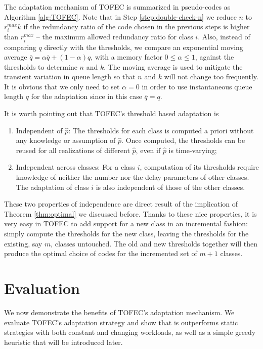 \documentclass[journal]{IEEEtran}
\newcommand{\ourproposal}{TOFEC\xspace}
\newcommand{\compVec}{\hat{p}}
\begin{document}
The adaptation mechanism of \ourproposal is summarized in pseudo-codes as Algorithm \ref{alg:TOFEC}.
Note that in Step \ref{step:double-check-n} we reduce $n$ to $r_i^{max}k$ if the redundancy ratio of the code chosen in the previous steps is higher than $r_i^{max}$ -- the maximum allowed redundancy ratio for class $i$. 
Also, instead of comparing $q$ directly with the thresholds, we compare an exponential moving average 
$\overline{q} = \alpha \overline{q} + (1-\alpha)q$,
with a memory factor $0\le \alpha \le 1$, against the thresholds to determine $n$ and $k$. The moving average is used to mitigate the transient variation in queue length so that $n$ and $k$ will not change too frequently. It is obvious that we only need to set $\alpha=0$ in order to use instantaneous queue length $q$ for the adaptation since in this case $\overline{q}=q$.

It is worth pointing out that \ourproposal's threshold based adaptation is 
\begin{enumerate}
	\item Independent of $\compVec$: The thresholds for each class is computed a priori without any knowledge or assumption of $\compVec$. Once computed, the thresholds can be reused for all realizations of different $\compVec$, even if $\compVec$ is time-varying;
	\item Independent across classes: For a class $i$, computation of its thresholds  require knowledge of neither the number nor the delay parameters of other classes. The adaptation of class $i$ is also independent of those of the other classes.
\end{enumerate}
These two properties of independence are direct result of the implication of Theorem \ref{thm:optimal} we discussed before.
Thanks to these nice properties, it is very easy in \ourproposal to add support for a new class in an incremental fashion: simply compute the thresholds for the new class, leaving the thresholds for the existing, say $m$, classes untouched. The old and new thresholds together will then produce the optimal choice of codes for the incremented set of $m+1$ classes.






\section{Evaluation}
\label{sec:evaluation}

We now demonstrate the benefits of \ourproposal 's adaptation mechanism. 
We evaluate \ourproposal's adaptation strategy and show that is outperforms static strategies with both constant and changing workloads, as well as a simple greedy heuristic that will be introduced later.
\end{document}
